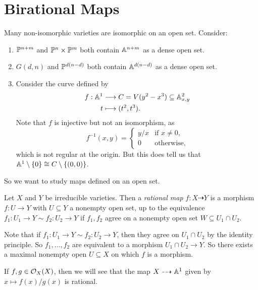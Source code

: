 \section{Birational Maps}

\begin{remark}
  Many non-isomorphic varieties are
  isomorphic on an open set. Consider:
  \begin{enumerate}
    \item $\mathbb{P}^{n + m}$ and
      $\mathbb{P}^n \times \mathbb{P}^m$ both contain
      $\mathbb{A}^{n + m}$ as a dense open
      set.
    \item $G(d, n)$ and
      $\mathbb{P}^{d(n - d)}$
      both contain $\mathbb{A}^{d(n - d)}$
      as a dense open set.
    \item Consider the curve defined by
      \begin{align*}
        f : \mathbb{A}^1 &\longrightarrow
        C = V(y^2 - x^3) \subseteq \mathbb{A}^2_{x, y} \\
        t &\longmapsto (t^2, t^3).
      \end{align*}
      Note that $f$ is injective but not an
      isomorphism, as
      \[
        f^{-1}(x, y) =
        \begin{cases}
          y / x & \text{if } x \ne 0, \\
          0 & \text{otherwise},
        \end{cases}
      \]
      which is not regular at the origin.
      But this does tell us that
      $\mathbb{A}^1 \setminus \{0\} \cong C \setminus \{(0, 0)\}$.
  \end{enumerate}
  So we want to study maps defined on an
  open set.
\end{remark}

\begin{definition}
  Let $X$ and $Y$ be irreducible varieties.
  Then a \emph{rational map}
  $f : X \dashrightarrow Y$ is a
  morphism $f : U \to Y$ with $U \subseteq Y$
  a nonempty open set, up to the
  equivalence
  $f_1 : U_1 \to Y \sim f_2 : U_2 \to Y$
  if $f_1, f_2$ agree on a
  nonempty open set
  $W \subseteq U_1 \cap U_2$.
\end{definition}

\begin{remark}
  Note that if
  $f_1 : U_1 \to Y \sim f_2 : U_2 \to Y$,
  then they agree on $U_1 \cap U_2$
  by the identity principle. So
  $f_1, \dots, f_2$ are equivalent
  to a morphism $U_1 \cap U_2 \to Y$.
  So there exists a maximal nonempty
  open $U \subseteq X$ on which $f$ is a
  morphism.
\end{remark}

\begin{remark}
  If $f, g \in \mathcal{O}_X(X)$, then we will see
  that the map
  $X \dashrightarrow \mathbb{A}^1$
  given by $x \mapsto f(x) / g(x)$
  is rational.
\end{remark}
